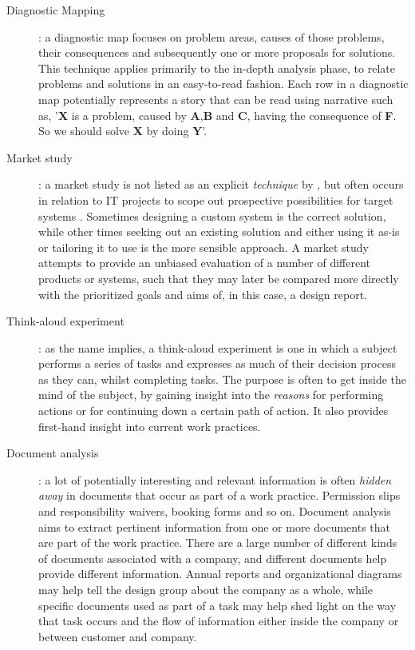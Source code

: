 \begin{description}
    \item [Diagnostic Mapping]: a diagnostic map focuses on problem areas, causes of those problems, their consequences
        and subsequently one or more proposals for solutions. This technique applies primarily to the in-depth analysis phase,
        to relate problems and solutions in an easy-to-read fashion. Each row in a diagnostic map potentially represents a story 
        that can be read using narrative such as, '\textbf{X} is a problem, caused by \textbf{A},\textbf{B} and \textbf{C}, having 
        the consequence of \textbf{F}. So we should solve \textbf{X} by doing \textbf{Y}'. 

    \item [Market study]: a market study is not listed as an explicit \textit{technique} by \cite{bodker2004participatory}, but often
        occurs in relation to IT projects to scope out prospective possibilities
        for target systems . Sometimes designing a custom system
        is the correct solution, while other times seeking out an existing solution and either using it as-is or tailoring it to use is
        the more sensible approach. A market study attempts to provide an unbiased evaluation of a number of different products or systems,
        such that they may later be compared more directly with the prioritized goals and aims of, in this case, a design report.

    \item [Think-aloud experiment]: as the name implies, a think-aloud experiment is one in which a subject performs
        a series of tasks and expresses as much of their decision process as they can, whilst completing tasks. The
        purpose is often to get inside the mind of the subject, by gaining insight into the \textit{reasons} for performing
        actions or for continuing down a certain path of action. It also provides first-hand insight into current work practices.

    \item [Document analysis]: a lot of potentially interesting and relevant information is often \textit{hidden away} in documents
        that occur as part of a work practice. Permission slips and responsibility waivers, booking forms and so on. Document analysis
        aims to extract pertinent information from one or more documents that are part of the work practice. There are a large number of
        different kinds of documents associated with a company, and different documents help provide different information. Annual reports
        and organizational diagrams may help tell the design group about the company as a whole, while specific documents used as part of
        a task may help shed light on the way that task occurs and the flow of information either inside the company or between customer
        and company.


\end{description}

